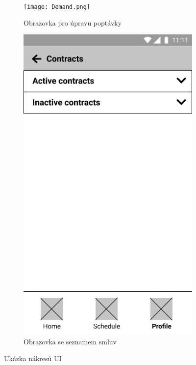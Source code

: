 \documentclass[twoside]{ctuthesis}
\begin{document}
\begin{figure}
	\begin{subfigure}{\textwidth}
		\centering
		\texttt{[image: Demand.png]}
		\caption{Obrazovka pro úpravu poptávky}
		\label{sub:lfp1}
	\end{subfigure}

	\begin{subfigure}{\textwidth}
		\centering
		\includegraphics[width=\textwidth]{contracts.png}
		\caption{Obrazovka se seznamem smluv}
		\label{sub:lfp2}
	\end{subfigure}

	\caption{Ukázka nákresů UI}
	\label{fig:lfp}
\end{figure}
\end{document}
